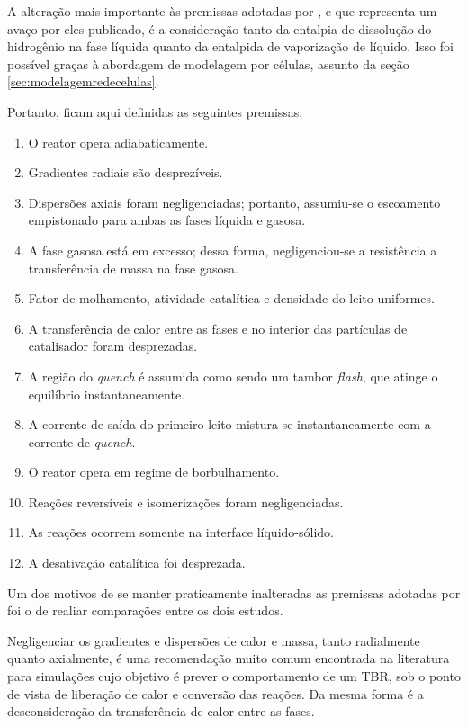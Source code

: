 A alteração mais importante às premissas adotadas por , e
que representa um avaço por eles publicado, é a consideração tanto da entalpia
de dissolução do hidrogênio na fase líquida quanto da entalpida de vaporização
de líquido. Isso foi possível graças à abordagem de modelagem por células,
assunto da seção \autoref{sec:modelagemredecelulas}.

Portanto, ficam aqui definidas as seguintes premissas:

\begin{enumerate}
  \item O reator opera adiabaticamente.
  \item Gradientes radiais são desprezíveis.
  \item Dispersões axiais foram negligenciadas; portanto, assumiu-se o
  escoamento empistonado para ambas as fases líquida e gasosa.
  \item A fase gasosa está em excesso; dessa forma, negligenciou-se a
  resistência a transferência de massa na fase gasosa.
  \item Fator de molhamento, atividade catalítica e densidade do leito
  uniformes.
  \item A transferência de calor entre as fases e no interior das partículas de
  catalisador foram desprezadas.
  \item A região do \emph{quench} é assumida como sendo um tambor \emph{flash}, que
  atinge o equilíbrio instantaneamente.
  \item A corrente de saída do primeiro leito mistura-se instantaneamente com a
  corrente de \emph{quench}.
  \item O reator opera em regime de borbulhamento.
  \item Reações reversíveis e isomerizações foram negligenciadas.
  \item As reações ocorrem somente na interface líquido-sólido.
  \item A desativação catalítica foi desprezada.
\end{enumerate}

Um dos motivos de se manter praticamente inalteradas as premissas adotadas por
 foi o de realiar comparações entre os dois estudos.

Negligenciar os gradientes e dispersões de calor e massa, tanto radialmente
quanto axialmente, é uma recomendação muito comum encontrada na literatura
\cite{Ancheyta2011, Ranade2011, Froment2011} para simulações cujo objetivo é
prever o comportamento de um TBR, sob o ponto de vista de liberação de calor e
conversão das reações. Da mesma forma é a desconsideração da transferência de
calor entre as fases.

